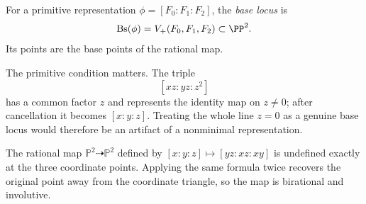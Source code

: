 \begin{definition}\label{def:vi44-base-locus}
For a primitive representation \(\phi=[F_0:F_1:F_2]\), the \emph{base locus} is
\[
  \Bs(\phi)=V_+(F_0,F_1,F_2)\subset\PP^2.
\]
Its points are the base points of the rational map.
\end{definition}

The primitive condition matters.  The triple
\[
  [xz:yz:z^2]
\]
has a common factor \(z\) and represents the identity map on \(z\neq0\); after cancellation it becomes \([x:y:z]\).  Treating the whole line \(z=0\) as a genuine base locus would therefore be an artifact of a nonminimal representation.



\begin{example}\label{ex:vi44-expand-01}
The rational map $\mathbb P^2\dashrightarrow\mathbb P^2$ defined by $[x:y:z]\mapsto[yz:xz:xy]$ is undefined exactly at the three coordinate points.  Applying the same formula twice recovers the original point away from the coordinate triangle, so the map is birational and involutive.
\end{example}
